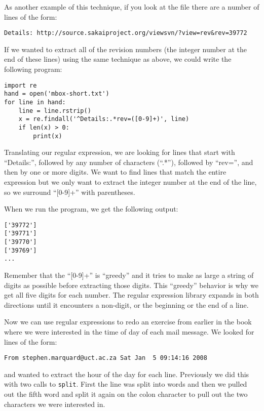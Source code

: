 As another example of this technique, if you look at the file there are a number of lines
of the form:

\beforeverb
\begin{verbatim}
Details: http://source.sakaiproject.org/viewsvn/?view=rev&rev=39772
\end{verbatim}
\afterverb
%
If we wanted to extract all of the revision numbers (the integer number at the end of these lines)
using the same technique as above, we could write the following program:

\beforeverb
\begin{verbatim}
import re
hand = open('mbox-short.txt')
for line in hand:
    line = line.rstrip()
    x = re.findall('^Details:.*rev=([0-9]+)', line)
    if len(x) > 0:
        print(x)
\end{verbatim}
\afterverb
%
Translating our regular expression, we are looking for lines that start with ``Details:'',
followed by any number of characters (``.*''), followed by ``rev='', and then by one or
more digits.   We want to find lines that match the entire expression but we only want to
extract the integer number at the end of the line, so we surround ``[0-9]+'' with parentheses.  

When we run the program, we get the following output:

\beforeverb
\begin{verbatim}
['39772']
['39771']
['39770']
['39769']
...
\end{verbatim}
\afterverb
%
Remember that the ``[0-9]+'' is ``greedy'' and it tries to make as large a string of digits as
possible before extracting those digits.  This ``greedy'' behavior is why we get all five digits
for each number.  The regular expression library expands in both directions until it encounters a
non-digit, or the beginning or the end of a line.

Now we can use regular expressions to redo an exercise from earlier in the book where we were
interested in the time of day of each mail message.   We looked for lines of the form:

\beforeverb
\begin{verbatim}
From stephen.marquard@uct.ac.za Sat Jan  5 09:14:16 2008
\end{verbatim}
\afterverb
%
and wanted to extract the hour of the day for each line.  Previously we did this with two calls
to {\tt split}.  First the line was split into words and then we pulled out the fifth word and split
it again on the colon character to pull out the two characters we were interested in.

